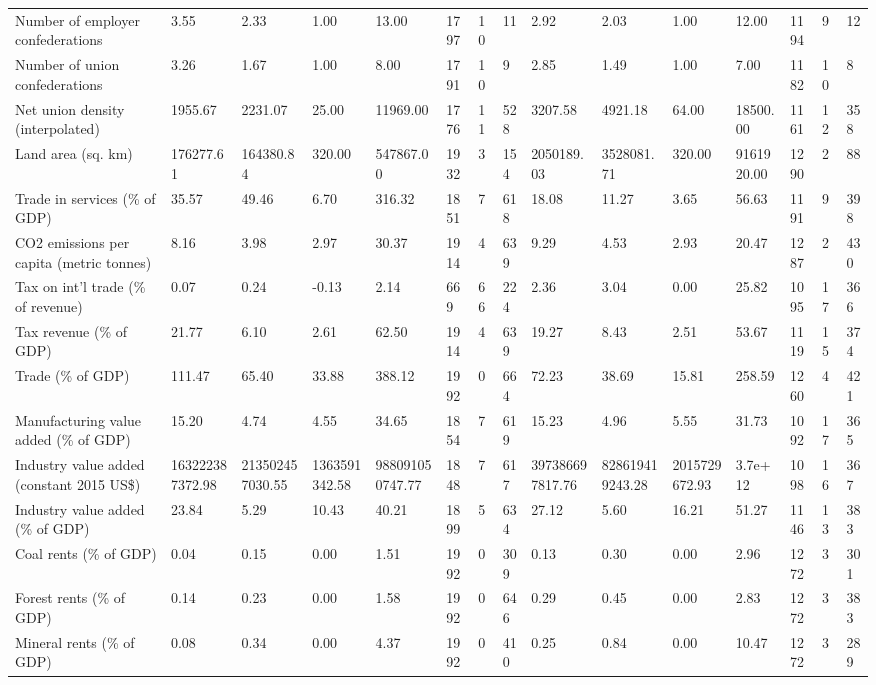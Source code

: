 \begin{longtable}{lllllllllllllll}
\addlinespace
Number of employer confederations & 3.55 & 2.33 & 1.00 & 13.00 & 1797 & 10 & 11 & 2.92 & 2.03 & 1.00 & 12.00 & 1194 & 9 & 12\\
Number of union confederations & 3.26 & 1.67 & 1.00 & 8.00 & 1791 & 10 & 9 & 2.85 & 1.49 & 1.00 & 7.00 & 1182 & 10 & 8\\
Net union density (interpolated) & 1955.67 & 2231.07 & 25.00 & 11969.00 & 1776 & 11 & 528 & 3207.58 & 4921.18 & 64.00 & 18500.00 & 1161 & 12 & 358\\
Land area (sq. km) & 176277.61 & 164380.84 & 320.00 & 547867.00 & 1932 & 3 & 154 & 2050189.03 & 3528081.71 & 320.00 & 9161920.00 & 1290 & 2 & 88\\
Trade in services (\% of GDP) & 35.57 & 49.46 & 6.70 & 316.32 & 1851 & 7 & 618 & 18.08 & 11.27 & 3.65 & 56.63 & 1191 & 9 & 398\\
\addlinespace
CO2 emissions per capita (metric tonnes) & 8.16 & 3.98 & 2.97 & 30.37 & 1914 & 4 & 639 & 9.29 & 4.53 & 2.93 & 20.47 & 1287 & 2 & 430\\
Tax on int'l trade (\% of revenue) & 0.07 & 0.24 & -0.13 & 2.14 & 669 & 66 & 224 & 2.36 & 3.04 & 0.00 & 25.82 & 1095 & 17 & 366\\
Tax revenue (\% of GDP) & 21.77 & 6.10 & 2.61 & 62.50 & 1914 & 4 & 639 & 19.27 & 8.43 & 2.51 & 53.67 & 1119 & 15 & 374\\
Trade (\% of GDP) & 111.47 & 65.40 & 33.88 & 388.12 & 1992 & 0 & 664 & 72.23 & 38.69 & 15.81 & 258.59 & 1260 & 4 & 421\\
Manufacturing value added (\% of GDP) & 15.20 & 4.74 & 4.55 & 34.65 & 1854 & 7 & 619 & 15.23 & 4.96 & 5.55 & 31.73 & 1092 & 17 & 365\\
\addlinespace
Industry value added (constant 2015 US\$) & 163222387372.98 & 213502457030.55 & 1363591342.58 & 988091050747.77 & 1848 & 7 & 617 & 397386697817.76 & 828619419243.28 & 2015729672.93 & 3.7e+12 & 1098 & 16 & 367\\
Industry value added (\% of GDP) & 23.84 & 5.29 & 10.43 & 40.21 & 1899 & 5 & 634 & 27.12 & 5.60 & 16.21 & 51.27 & 1146 & 13 & 383\\
Coal rents (\% of GDP) & 0.04 & 0.15 & 0.00 & 1.51 & 1992 & 0 & 309 & 0.13 & 0.30 & 0.00 & 2.96 & 1272 & 3 & 301\\
Forest rents (\% of GDP) & 0.14 & 0.23 & 0.00 & 1.58 & 1992 & 0 & 646 & 0.29 & 0.45 & 0.00 & 2.83 & 1272 & 3 & 383\\
Mineral rents (\% of GDP) & 0.08 & 0.34 & 0.00 & 4.37 & 1992 & 0 & 410 & 0.25 & 0.84 & 0.00 & 10.47 & 1272 & 3 & 289\\

\end{longtable}
